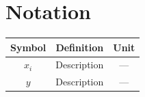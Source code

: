 \section{Notation}

\begin{center}
\begin{tabular}{c|c|c}
  \toprule
  \textbf{Symbol} & \textbf{Definition} & \textbf{Unit} \\
  \midrule
  $x_i$    & Description & --- \\
  $y$      & Description & --- \\
  \bottomrule
\end{tabular}
\end{center}

